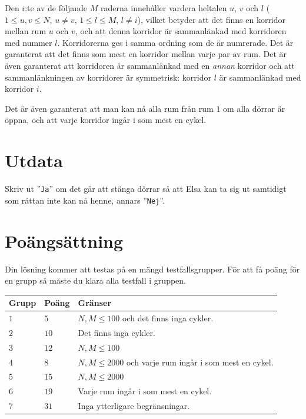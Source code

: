 Den $i$:te av de följande $M$ raderna innehåller vardera heltalen $u$, $v$ och $l$ ($1 \leq u,v \leq N$, $u \neq v$, $1 \leq l \leq M$, $l \neq i$),
vilket betyder att det finns en korridor mellan rum $u$ och $v$, och att denna korridor är sammanlänkad med korridoren med nummer $l$.
Korridorerna ges i samma ordning som de är numrerade.
Det är garanterat att det finns som mest en korridor mellan varje par av rum.
Det är även garanterat att korridoren är sammanlänkad med en \textit{annan} korridor och att sammanlänkningen av korridorer är symmetrisk: korridor $l$ är sammanlänkad med korridor $i$.

Det är även garanterat att man kan nå alla rum från rum $1$ om alla dörrar är öppna, och att varje korridor ingår i som mest en cykel.

\section*{Utdata}
Skriv ut ''\texttt{Ja}'' om det går att stänga dörrar så att Elsa kan ta sig ut samtidigt som råttan inte kan nå henne, annars ''\texttt{Nej}''.

\section*{Poängsättning}
Din lösning kommer att testas på en mängd testfallsgrupper.
För att få poäng för en grupp så måste du klara alla testfall i gruppen.

\noindent
\begin{tabular}{| l | l | p{12cm} |}
  \hline
  \textbf{Grupp} & \textbf{Poäng} & \textbf{Gränser} \\ \hline
  $1$    & $5$        & $N, M \leq 100$ och det finns inga cykler. \\ \hline
  $2$    & $10$       & Det finns inga cykler. \\ \hline
  $3$    & $12$       & $N, M \leq 100$ \\ \hline
  $4$    & $8$        & $N, M \leq 2000$ och varje rum ingår i som mest en cykel. \\ \hline %
  $5$    & $15$       & $N, M \leq 2000$ \\ \hline
  $6$    & $19$       & Varje rum ingår i som mest en cykel. \\ \hline
  $7$    & $31$       & Inga ytterligare begränsningar. \\ \hline %
\end{tabular}

